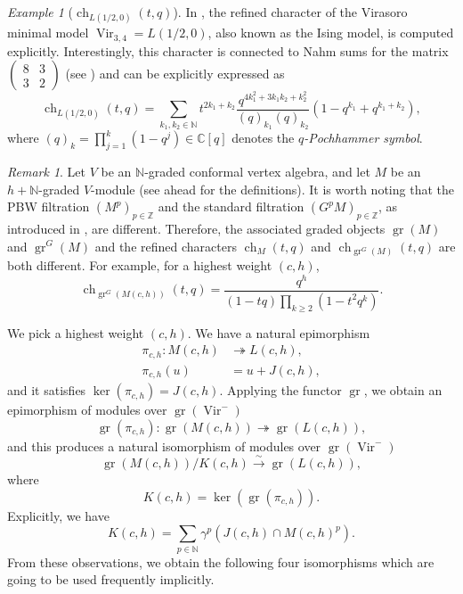 \documentclass[a4paper, 12pt, reqno]{amsart}
\theoremstyle{remark}
\newtheorem{remark}[theorem]{Remark}
\newtheorem{example}[theorem]{Example}
\DeclareMathOperator{\Vir}{Vir}
\DeclareMathOperator{\ch}{ch}
\DeclareMathOperator{\gr}{gr}
\begin{document}
\begin{example}[$\ch_{L(1/2, 0)}(t, q)$]
  \label{exa:8}
  In \cite{andrews_singular_2022}, the refined character of the Virasoro minimal model $\Vir_{3, 4} = L(1/2, 0)$, also known as the Ising model, is computed explicitly.
  Interestingly, this character is connected to Nahm sums for the matrix $\left(\begin{smallmatrix} 8 & 3 \\ 3 & 2 \end{smallmatrix}\right)$ (see \cite{Nahm2007}) and can be explicitly expressed as
  \begin{equation*}
    \ch_{L(1/2, 0)}(t, q) = \sum_{k_1, k_2 \in \mathbb{N}}t^{2k_1 + k_2}\frac{q^{4k_1^2 + 3k_1k_2 + k_2^2}}{(q)_{k_1}(q)_{k_2}}(1 - q^{k_1} + q^{k_1 + k_2}),
  \end{equation*}
  where $(q)_k = \prod_{j = 1}^k(1 - q^j) \in \mathbb{C}[q]$ denotes the \emph{$q$-Pochhammer symbol}.
\end{example}

\begin{remark}
  \label{rmk:3}
  Let $V$ be an $\mathbb{N}$-graded conformal vertex algebra, and let $M$ be an $h + \mathbb{N}$-graded $V$-module (see  ahead for the definitions).
  It is worth noting that the PBW filtration $(M^p)_{p \in \mathbb{Z}}$ and the standard filtration $(G^pM)_{p \in \mathbb{Z}}$, as introduced in \cite{salazar_pbw_2024}, are different.
  Therefore, the associated graded objects $\gr(M)$ and $\gr^G(M)$ and the refined characters $\ch_M(t, q)$ and $\ch_{\gr^G(M)}(t, q)$ are both different.
  For example, for a highest weight $(c, h)$,
  \begin{equation*}
    \ch_{\gr^G(M(c, h))}(t, q) = \frac{q^h}{(1 - tq)\prod_{k \ge 2}(1 - t^2q^k)}.
  \end{equation*}
\end{remark}

We pick a highest weight $(c, h)$.
We have a natural epimorphism
\begin{align*}
  \pi_{c, h}: M(c, h) &\twoheadrightarrow L(c, h), \\
  \pi_{c, h}(u) &= u + J(c, h),
\end{align*}
and it satisfies $\ker(\pi_{c, h}) = J(c, h)$.
Applying the functor $\gr$, we obtain an epimorphism of modules over $\gr(\Vir^-)$
\begin{equation*}
  \gr(\pi_{c, h}): \gr(M(c, h)) \twoheadrightarrow \gr(L(c, h)),
\end{equation*}
and this produces a natural isomorphism of modules over $\gr(\Vir^{-})$
\begin{equation*}
  \gr(M(c, h))/K(c, h) \xrightarrow{\sim} \gr(L(c, h)),
\end{equation*}
where
\begin{equation*}
  K(c, h) = \ker(\gr(\pi_{c, h})).
\end{equation*}
Explicitly, we have
\begin{equation}
  \label{eq:2}
  K(c, h) = \sum_{p \in \mathbb{N}}\gamma^p(J(c, h) \cap M(c, h)^p).
\end{equation}
From these observations, we obtain the following four isomorphisms which are going to be used frequently implicitly.
\end{document}
